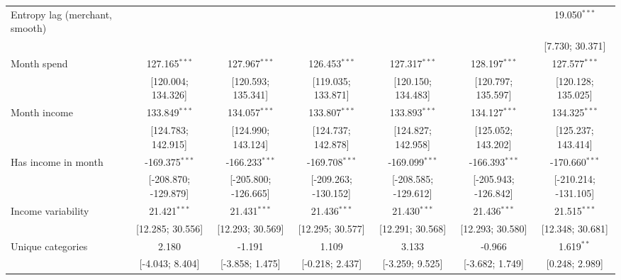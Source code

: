 \begin{table}[htbp]
\begin{threeparttable}[b]
\begin{tabular}{lcccccc}
         Entropy lag (merchant, smooth) &                      &                      &                      &                      &                      & 19.050$^{***}$\\   
                                        &                      &                      &                      &                      &                      & [7.730; 30.371]\\   
         Month spend                    & 127.165$^{***}$      & 127.967$^{***}$      & 126.453$^{***}$      & 127.317$^{***}$      & 128.197$^{***}$      & 127.577$^{***}$\\   
                                        & [120.004; 134.326]   & [120.593; 135.341]   & [119.035; 133.871]   & [120.150; 134.483]   & [120.797; 135.597]   & [120.128; 135.025]\\   
         Month income                   & 133.849$^{***}$      & 134.057$^{***}$      & 133.807$^{***}$      & 133.893$^{***}$      & 134.127$^{***}$      & 134.325$^{***}$\\   
                                        & [124.783; 142.915]   & [124.990; 143.124]   & [124.737; 142.878]   & [124.827; 142.958]   & [125.052; 143.202]   & [125.237; 143.414]\\   
         Has income in month            & -169.375$^{***}$     & -166.233$^{***}$     & -169.708$^{***}$     & -169.099$^{***}$     & -166.393$^{***}$     & -170.660$^{***}$\\   
                                        & [-208.870; -129.879] & [-205.800; -126.665] & [-209.263; -130.152] & [-208.585; -129.612] & [-205.943; -126.842] & [-210.214; -131.105]\\   
         Income variability             & 21.421$^{***}$       & 21.431$^{***}$       & 21.436$^{***}$       & 21.430$^{***}$       & 21.436$^{***}$       & 21.515$^{***}$\\   
                                        & [12.285; 30.556]     & [12.293; 30.569]     & [12.295; 30.577]     & [12.291; 30.568]     & [12.293; 30.580]     & [12.348; 30.681]\\   
         Unique categories              & 2.180                & -1.191               & 1.109                & 3.133                & -0.966               & 1.619$^{**}$\\   
                                        & [-4.043; 8.404]      & [-3.858; 1.475]      & [-0.218; 2.437]      & [-3.259; 9.525]      & [-3.682; 1.749]      & [0.248; 2.989]\\   

\end{tabular}
\end{threeparttable}
\end{table}
